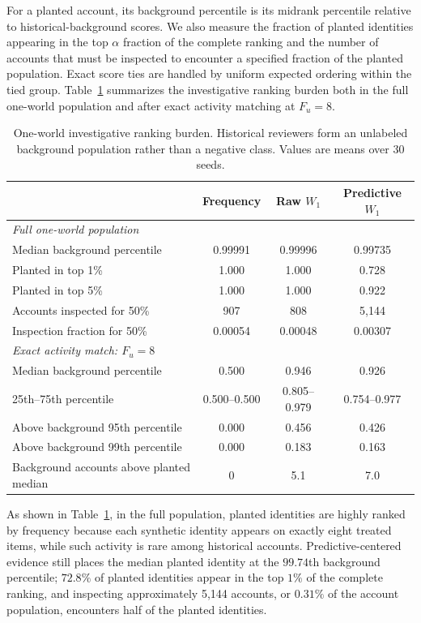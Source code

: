 For a planted account, its background percentile is its midrank percentile
relative to historical-background scores.  We also measure the fraction of
planted identities appearing in the top $\alpha$ fraction of the complete
ranking and the number of accounts that must be inspected to encounter a
specified fraction of the planted population.  Exact score ties are handled by
uniform expected ordering within the tied group. Table~\ref{tab:supp-one-world-ranking} summarizes the investigative ranking
burden both in the full one-world population and after exact activity matching
at $F_u=8$.

\begin{table}[t]
\caption{One-world investigative ranking burden. Historical reviewers form an
unlabeled background population rather than a negative class. Values are
means over 30 seeds.}
\label{tab:supp-one-world-ranking}
\centering
\small
\setlength{\tabcolsep}{3pt}
\begin{tabularx}{\columnwidth}{@{}Xccc@{}}
\toprule
& Frequency & Raw $W_1$ & Predictive $W_1$ \\
\midrule
\multicolumn{4}{l}{\emph{Full one-world population}} \\
Median background percentile
& 0.99991 & 0.99996 & 0.99735 \\
Planted in top 1\%
& 1.000 & 1.000 & 0.728 \\
Planted in top 5\%
& 1.000 & 1.000 & 0.922 \\
Accounts inspected for 50\%
& 907 & 808 & 5,144 \\
Inspection fraction for 50\%
& 0.00054 & 0.00048 & 0.00307 \\
\midrule
\multicolumn{4}{l}{\emph{Exact activity match: $F_u=8$}} \\
Median background percentile
& 0.500 & 0.946 & 0.926 \\
25th--75th percentile
& 0.500--0.500
& 0.805--0.979
& 0.754--0.977 \\
Above background 95th percentile
& 0.000 & 0.456 & 0.426 \\
Above background 99th percentile
& 0.000 & 0.183 & 0.163 \\
Background accounts above planted median
& 0 & 5.1 & 7.0 \\
\bottomrule
\end{tabularx}
\end{table}
As shown in Table~\ref{tab:supp-one-world-ranking}, in the full population, planted identities are highly ranked by frequency
because each synthetic identity appears on exactly eight treated items, while
such activity is rare among historical accounts.  Predictive-centered evidence
still places the median planted identity at the $99.74$th background
percentile; $72.8\%$ of planted identities appear in the top $1\%$ of the
complete ranking, and inspecting approximately 5,144 accounts, or $0.31\%$ of
the account population, encounters half of the planted identities.

